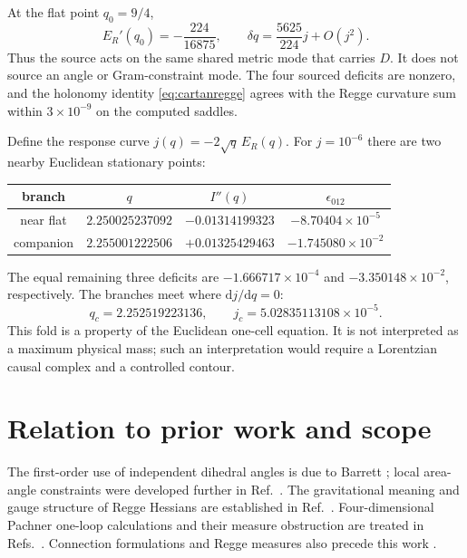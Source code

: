 \documentclass[11pt]{article}
\theoremstyle{definition}
\theoremstyle{remark}
\newcommand{\dd}{\mathrm d}
\begin{document}
At the flat point $q_0=9/4$,
\begin{equation}
 E_R'(q_0)=-\frac{224}{16875},\qquad
 \delta q=\frac{5625}{224}j+O(j^2).
 \label{eq:linearresponse}
\end{equation}
Thus the source acts on the same shared metric mode that carries $D$.  It does not source an angle or Gram-constraint mode.  The four sourced deficits are nonzero, and the holonomy identity \eqref{eq:cartanregge} agrees with the Regge curvature sum within $3\times10^{-9}$ on the computed saddles.

Define the response curve $j(q)=-2\sqrt q\,E_R(q)$.  For $j=10^{-6}$ there are two nearby Euclidean stationary points:
\begin{center}
\begin{tabular}{cccc}
\toprule
branch & $q$ & $I''(q)$ & $\epsilon_{012}$\\
\midrule
near flat & $2.250025237092$ & $-0.01314199323$ & $-8.70404\times10^{-5}$\\
companion & $2.255001222506$ & $+0.01325429463$ & $-1.745080\times10^{-2}$\\
\bottomrule
\end{tabular}
\end{center}
The equal remaining three deficits are $-1.666717\times10^{-4}$ and $-3.350148\times10^{-2}$, respectively.  The branches meet where $\dd j/\dd q=0$:
\begin{equation}
 q_c=2.252519223136,\qquad j_c=5.02835113108\times10^{-5}.
\end{equation}
This fold is a property of the Euclidean one-cell equation.  It is not interpreted as a maximum physical mass; such an interpretation would require a Lorentzian causal complex and a controlled contour.

\section{Relation to prior work and scope}

The first-order use of independent dihedral angles is due to Barrett \cite{Barrett1994}; local area-angle constraints were developed further in Ref.~\cite{DittrichSpeziale2008}.  The gravitational meaning and gauge structure of Regge Hessians are established in Ref.~\cite{DittrichFreidelSpeziale2008}.  Four-dimensional Pachner one-loop calculations and their measure obstruction are treated in Refs.~\cite{DittrichSteinhaus2012,BorissovaDittrich2023}.  Connection formulations and Regge measures also precede this work \cite{Khatsymovsky2001,Khatsymovsky2015}.
\end{document}
